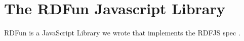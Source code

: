 \chapter{The RDFun Javascript Library} \label{apd:rdfun}

RDFun is a JavaScript Library we wrote that implements the RDFJS spec \cite{rdfjs}. 



\newpage


